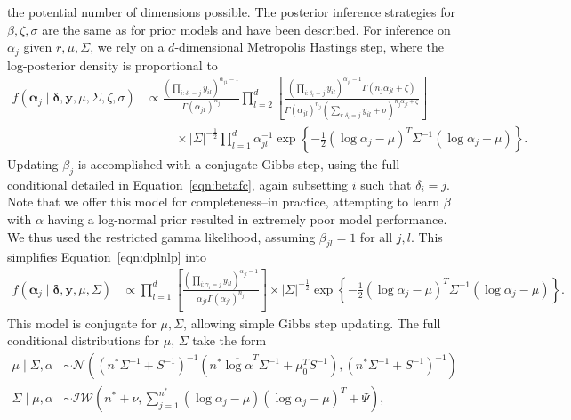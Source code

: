   the potential number of dimensions possible.  The posterior inference strategies for $\beta,\zeta,\sigma$
  are the same as for prior models and have been described.  For inference on $\alpha_j$ given
  $r, \mu,\Sigma$, we rely on a $d$-dimensional Metropolis Hastings step, where the log-posterior
  density is proportional to
  \begin{equation}
    \label{eqn:dplnlp}
    \begin{aligned}
    f(\bm{\alpha}_j\mid\bm{\delta},\bm{y},\mu,\Sigma,\zeta,\sigma) &\propto
    \frac{\left(\prod_{i:\delta_i = j}y_{il}\right)^{\alpha_{j1} - 1}}{\Gamma(\alpha_{j1})^{n_j}}
        \prod_{l = 2}^d\left[\frac{\left(\prod_{i:\delta_i = j}y_{il}\right)^{\alpha_{jl} - 1}
        \Gamma(n_j\alpha_{jl} + \zeta)}{\Gamma(\alpha_{jl})^{n_j}\left(\sum_{i:\delta_i = j}y_{il}
        + \sigma\right)^{n_j\alpha_{jl} + \zeta}}\right]\\
        &\hspace{1cm}\times
        \lvert \Sigma\rvert^{-\frac{1}{2}}\prod_{l=1}^d\alpha_{jl}^{-1}\exp\left\lbrace
          -\frac{1}{2}(\log\alpha_j - \mu)^T\Sigma^{-1}(\log\alpha_j - \mu)\right\rbrace.
    \end{aligned}
  \end{equation}
  Updating $\beta_j$ is accomplished with a conjugate Gibbs step, using the full conditional detailed
  in Equation~\ref{eqn:betafc}, again subsetting $i$ such that $\delta_i = j$.  Note that we offer this
  model for completeness--in practice, attempting to learn $\beta$ with $\alpha$ having a log-normal
  prior resulted in extremely poor model performance.  We thus used the restricted gamma likelihood,
  assuming $\beta_{jl} = 1$ for all $j,l$.  This simplifies Equation~\ref{eqn:dplnlp} into
  \begin{equation}
    \label{eqn:dplnlpr}
    \begin{aligned}
    f(\bm{\alpha}_j\mid\bm{\delta},\bm{y},\mu,\Sigma) &\propto
    \prod_{l = 1}^d\left[\frac{\left(\prod_{i:\gamma_i = j}y_{il}\right)^{\alpha_{jl} - 1}}{\alpha_{jl}\Gamma(\alpha_{jl})^{n_j}} \right]\times\lvert\Sigma\rvert^{-\frac{1}{2}}
      \exp\left\lbrace-\frac{1}{2}(\log\alpha_j - \mu)^T\Sigma^{-1}(\log\alpha_j - \mu)\right\rbrace.
    \end{aligned}
  \end{equation}
  This model is conjugate for $\mu,\Sigma$, allowing simple Gibbs step updating.  The full
    conditional distributions for $\mu$, $\Sigma$ take the form
  \begin{equation}
    \begin{aligned}
    \mu\mid\Sigma,\alpha &\sim \mathcal{N}\left((n^*\Sigma^{-1} + S^{-1})^{-1}(n^*\overline{\log\alpha}^T\Sigma^{-1}
      + \mu_0^TS^{-1}),(n^{*}\Sigma^{-1} + S^{-1})^{-1}\right)\\
    \Sigma\mid\mu,\alpha &\sim \mathcal{IW}\left(
        n^* + \nu, {\textstyle\sum}_{j = 1}^{n^*}(\log\alpha_j - \mu)(\log\alpha_j - \mu)^T + \Psi\right),
    \end{aligned}
  \end{equation}
